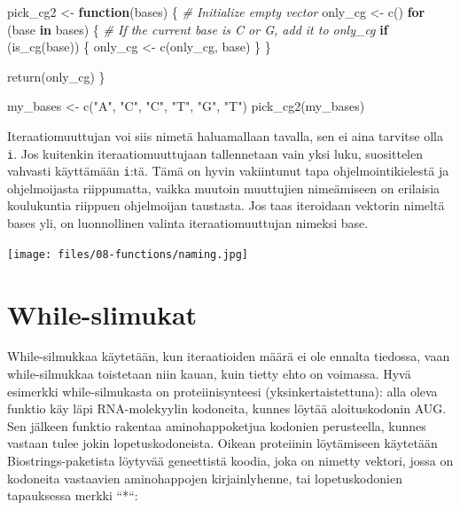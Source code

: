 \documentclass[
]{book}
\newenvironment{Shaded}{\begin{snugshade}}{\end{snugshade}}
\newcommand{\CommentTok}[1]{\textcolor[rgb]{0.56,0.35,0.01}{\textit{#1}}}
\newcommand{\ControlFlowTok}[1]{\textcolor[rgb]{0.13,0.29,0.53}{\textbf{#1}}}
\newcommand{\FunctionTok}[1]{\textcolor[rgb]{0.00,0.00,0.00}{#1}}
\newcommand{\NormalTok}[1]{#1}
\newcommand{\OtherTok}[1]{\textcolor[rgb]{0.56,0.35,0.01}{#1}}
\newcommand{\StringTok}[1]{\textcolor[rgb]{0.31,0.60,0.02}{#1}}
\begin{document}
\begin{Shaded}
\begin{Highlighting}[]
\NormalTok{pick\_cg2 }\OtherTok{\textless{}{-}} \ControlFlowTok{function}\NormalTok{(bases) \{}
  \CommentTok{\# Initialize empty vector}
\NormalTok{  only\_cg }\OtherTok{\textless{}{-}} \FunctionTok{c}\NormalTok{()}
  \ControlFlowTok{for}\NormalTok{ (base }\ControlFlowTok{in}\NormalTok{ bases) \{}
    \CommentTok{\# If the current base is C or G, add it to only\_cg}
    \ControlFlowTok{if}\NormalTok{ (}\FunctionTok{is\_cg}\NormalTok{(base)) \{}
\NormalTok{      only\_cg }\OtherTok{\textless{}{-}} \FunctionTok{c}\NormalTok{(only\_cg, base)}
\NormalTok{    \}}
\NormalTok{  \}}
  
  \FunctionTok{return}\NormalTok{(only\_cg)}
\NormalTok{\}}

\NormalTok{my\_bases }\OtherTok{\textless{}{-}} \FunctionTok{c}\NormalTok{(}\StringTok{"A"}\NormalTok{, }\StringTok{"C"}\NormalTok{, }\StringTok{"C"}\NormalTok{, }\StringTok{"T"}\NormalTok{, }\StringTok{"G"}\NormalTok{, }\StringTok{"T"}\NormalTok{)}
\FunctionTok{pick\_cg2}\NormalTok{(my\_bases)}
\end{Highlighting}
\end{Shaded}

Iteraatiomuuttujan voi siis nimetä haluamallaan tavalla, sen ei aina tarvitse olla \texttt{i}. Jos kuitenkin iteraatiomuuttujaan tallennetaan vain yksi luku, suosittelen vahvasti käyttämään \texttt{i}:tä. Tämä on hyvin vakiintunut tapa ohjelmointikielestä ja ohjelmoijasta riippumatta, vaikka muutoin muuttujien nimeämiseen on erilaisia koulukuntia riippuen ohjelmoijan taustasta. Jos taas iteroidaan vektorin nimeltä bases yli, on luonnollinen valinta iteraatiomuuttujan nimeksi base.

\texttt{[image: files/08-functions/naming.jpg]}

\hypertarget{while-slimukat}{%
\section{While-slimukat}\label{while-slimukat}}

While-silmukkaa käytetään, kun iteraatioiden määrä ei ole ennalta tiedossa, vaan while-silmukkaa toistetaan niin kauan, kuin tietty ehto on voimassa. Hyvä esimerkki while-silmukasta on proteiinisynteesi (yksinkertaistettuna): alla oleva funktio käy läpi RNA-molekyylin kodoneita, kunnes löytää aloituskodonin AUG. Sen jälkeen funktio rakentaa aminohappoketjua kodonien perusteella, kunnes vastaan tulee jokin lopetuskodoneista. Oikean proteiinin löytämiseen käytetään Biostrings-paketista löytyvää geneettistä koodia, joka on nimetty vektori, jossa on kodoneita vastaavien aminohappojen kirjainlyhenne, tai lopetuskodonien tapauksessa merkki ``*``:
\end{document}
